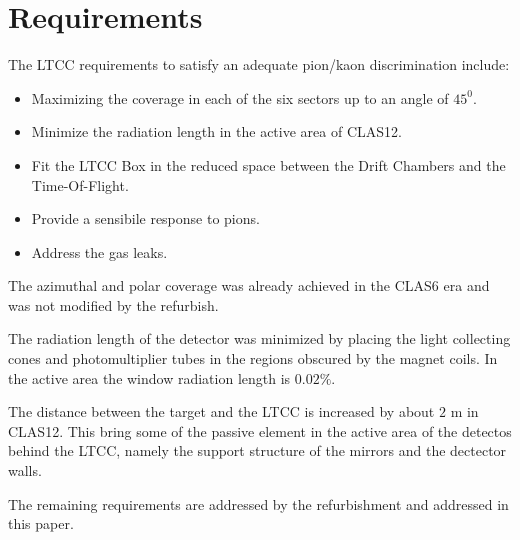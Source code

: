 \section{Requirements}


The LTCC requirements to satisfy an adequate pion/kaon discrimination include:


\begin{itemize}
	\item Maximizing the coverage in each of the six sectors up to an angle of $45^0$.
	\item Minimize the radiation length in the active area of CLAS12.
	\item Fit the LTCC Box in the reduced space between the Drift Chambers and the Time-Of-Flight.
	\item Provide a sensibile response to pions.
	\item Address the gas leaks.
\end{itemize}

The azimuthal and polar coverage was already achieved in the CLAS6 era and was not modified by the refurbish.

The radiation length of the detector was minimized by placing the light collecting cones and photomultiplier tubes
in the regions obscured by the magnet coils. In the active area the window radiation length is $0.02\%$.

The distance between the target and the LTCC is increased by about $2$ m in CLAS12. This bring some of the passive
element in the active area of the detectos behind the LTCC, namely the support structure of the mirrors and the
dectector walls.

The remaining requirements are addressed by the refurbishment and addressed in this paper.
